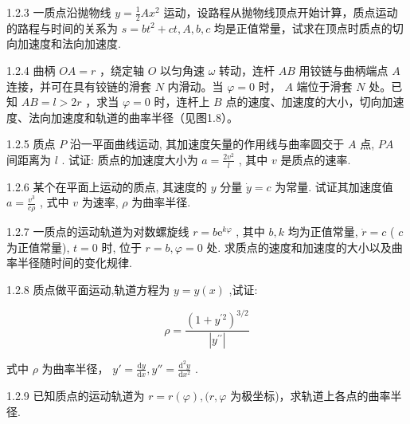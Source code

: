 \begin{problem}{1.2.3}
一质点沿抛物线 $y = \frac{1}{2} Ax^2$ 运动，设路程从抛物线顶点开始计算，质点运动的路程与时间的关系为 $s = bt^2 + ct, A, b, c$ 均是正值常量，试求在顶点时质点的切向加速度和法向加速度.
\end{problem}
\clearpage


\begin{problem}{1.2.4}
曲柄 $OA = r$ ，绕定轴 $O$ 以匀角速 $\omega$ 转动，连杆 $AB$ 用铰链与曲柄端点 $A$ 连接，并可在具有铰链的滑套 $N$ 内滑动。当 $\varphi = 0$ 时， $A$ 端位于滑套 $N$ 处。已知 $AB = l > 2r$ ，求当 $\varphi = 0$ 时，连杆上 $B$ 点的速度、加速度的大小，切向加速度、法向加速度和轨道的曲率半径（见图1.8）。
\begin{center}

\end{center}
\end{problem}
\clearpage


\begin{problem}{1.2.5}
质点 $P$ 沿一平面曲线运动, 其加速度矢量的作用线与曲率圆交于 $A$ 点, $PA$ 间距离为 $l$ . 试证: 质点的加速度大小为 $a = \frac{2v^2}{l}$ , 其中 $v$ 是质点的速率.
\end{problem}
\clearpage


\begin{problem}{1.2.6}
某个在平面上运动的质点, 其速度的 $y$ 分量 $\dot{y} = c$ 为常量. 试证其加速度值 $a = \frac{v^3}{c\rho}$ , 式中 $v$ 为速率, $\rho$ 为曲率半径.
\end{problem}
\clearpage


\begin{problem}{1.2.7}
一质点的运动轨道为对数螺旋线 $r = b\mathrm{e}^{k\varphi}$ , 其中 $b, k$ 均为正值常量, $\dot{r} = c$ ( $c$ 为正值常量), $t = 0$ 时, 位于 $r = b, \varphi = 0$ 处. 求质点的速度和加速度的大小以及曲率半径随时间的变化规律.
\end{problem}
\clearpage


\begin{problem}{1.2.8}
质点做平面运动,轨道方程为 $y=y(x)$ ,试证:

\[
\rho = \frac {(1 + y ^ {\prime 2}) ^ {3 / 2}}{| y ^ {\prime \prime} |}
\]

式中 $\rho$ 为曲率半径， $y' = \frac{\mathrm{d}y}{\mathrm{d}x}, y'' = \frac{\mathrm{d}^2y}{\mathrm{d}x^2}$ .
\end{problem}
\clearpage


\begin{problem}{1.2.9}
已知质点的运动轨道为 $r = r(\varphi), (r, \varphi$ 为极坐标)，求轨道上各点的曲率半径.
\end{problem}
\clearpage


